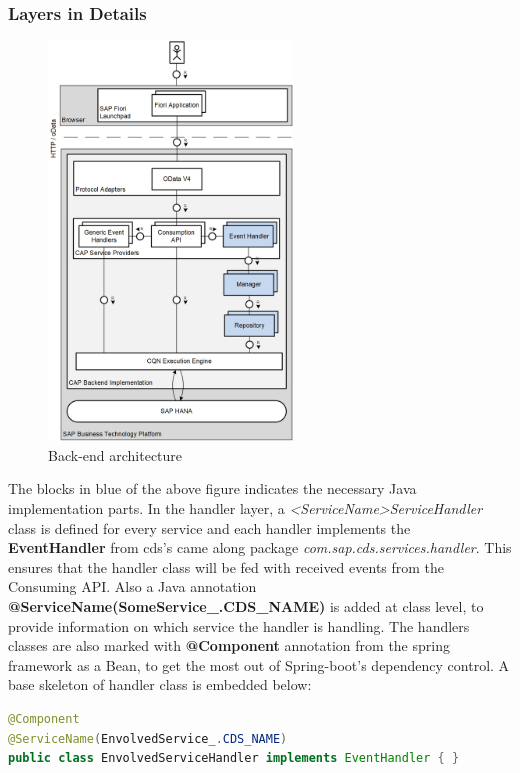 \subsubsection{Layers in Details}

\begin{figure}[H]
	\centering
	\includegraphics[height=400px]{images/backend_architecture.png}
	\caption{Back-end architecture}
	\label{fig:backArch}
\end{figure}

The blocks in blue of the above figure indicates the necessary Java implementation parts. In the handler layer, a \textit{<ServiceName>ServiceHandler} class is defined for every service and each handler implements the \textbf{EventHandler} from cds's came along package \textit{com.sap.cds.services.handler}. This ensures that the handler class will be fed with received events from the Consuming API. Also a Java annotation \textbf{@ServiceName(SomeService\_.CDS\_NAME)} is added at class level, to provide information on which service the handler is handling. The handlers classes are also marked with \textbf{@Component} annotation from the spring framework as a Bean, to get the most out of Spring-boot's dependency control. A base skeleton of handler class is embedded below:

\begin{lstlisting}[language={java}]
@Component
@ServiceName(EnvolvedService_.CDS_NAME)
public class EnvolvedServiceHandler implements EventHandler { }
\end{lstlisting}

